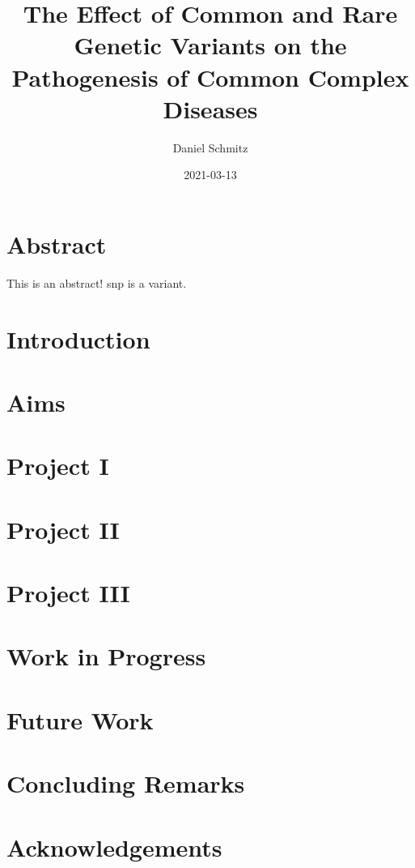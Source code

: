\documentclass[]{scrbook}
\title{The Effect of Common and Rare Genetic Variants on the Pathogenesis of Common Complex Diseases}
\author{Daniel Schmitz}
\date{2021-03-13}
\begin{document}
\frontmatter

\begin{titlepage}
    \maketitle
\end{titlepage}
\printglossary
\chapter{Abstract}
    This is an abstract! \Gls{snp} is a \gls{variant}.
\tableofcontents

\mainmatter

\chapter{Introduction}

\chapter{Aims}

\chapter{Project I}

\chapter{Project II}

\chapter{Project III}

\chapter{Work in Progress}

\chapter{Future Work}

\chapter{Concluding Remarks}


\backmatter

\chapter{Acknowledgements}
\printbibliography
\end{document}
